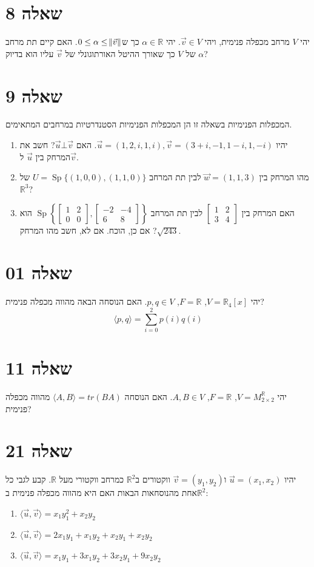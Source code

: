 \documentclass[11pt, oneside]{article}
\newcommand{\mR}{\mathbb{R}}
\DeclareMathOperator{\Sp}{Sp}
\newcommand{\mtf}[4]{\begin{bmatrix}#1 & #2\\ #3 & #4\end{bmatrix}}
\newcommand{\ip}[2]{\langle #1, #2 \rangle}
\begin{document}
\section{שאלה 8}
יהי $V$ מרחב מכפלה פנימית, ויהי $\vec{v} \in V$. יהי $\alpha \in \mR$ כך ש$0 \le \alpha \le \norm{\vec{v}}$. האם קיים תת מרחב של $V$ כך שאורך ההיטל האורתוגונלי של $\vec{v}$ עליו הוא בדיוק $\alpha$?
\section{שאלה 9}
המכפלות הפנימיות בשאלה זו הן המכפלות הפנימיות הסטנדרטיות במרחבים המתאימים.
\begin{enumerate}
\item יהיו $\vec{u} = (1, 2, i, 1, i), \vec{v} = (3 + i, -1, 1 - i, 1, -i)$. האם $\vec{u} \bot \vec{v}$? חשב את המרחק בין $\vec{u}$ ל$\vec{v}$.
\item מהו המרחק בין $\vec{w} = (1, 1, 3)$ לבין תת המרחב $U = \Sp\{(1, 0, 0), (1, 1, 0)\}$ של $\mR^3$?
\item האם המרחק בין $\mtf{1}{2}{3}{4}$ לבין תת המרחב $\Sp\left\{\mtf{1}{2}{0}{0}, \mtf{-2}{-4}{6}{8}\right\}$ הוא $\sqrt{243}$? אם כן, הוכח. אם לא, חשב מהו המרחק.
\end{enumerate}

\section{שאלה 01}
יהי $V = \mR_4[x]$, $F = \mR$, $p, q \in V$. האם הנוסחה הבאה מהווה מכפלה פנימית?
\[
\ip{p}{q} = \sum^{2}_{i = 0} p(i)q(i)
\]

\section{שאלה 11}
יהי $V = M^{\mR}_{2\times2}$, $F = \mR$, $A, B \in V$. האם הנוסחה $\ip{A}{B} = tr(BA)$ מהווה מכפלה פנימית?
\section{שאלה 21}
יהיו $\vec{u} = (x_1, x_2)$ ו$\vec{v} = (y_1, y_2)$ ווקטורים ב$\mR^2$ כמרחב ווקטורי מעל $\mR$. קבע לגבי כל אחת מהנוסחאות הבאות האם היא מהווה מכפלה פנימית ב$\mR^2$:
\begin{enumerate}
\item $\ip{\vec{u}}{\vec{v}} = x_1y_1^2 + x_2y_2$
\item $\ip{\vec{u}}{\vec{v}} = 2x_1y_1 + x_1y_2 + x_2y_1 + x_2y_2$
\item $\ip{\vec{u}}{\vec{v}} = x_1y_1 + 3x_1y_2 + 3x_2y_1 + 9x_2y_2$
\end{enumerate}
\end{document}
